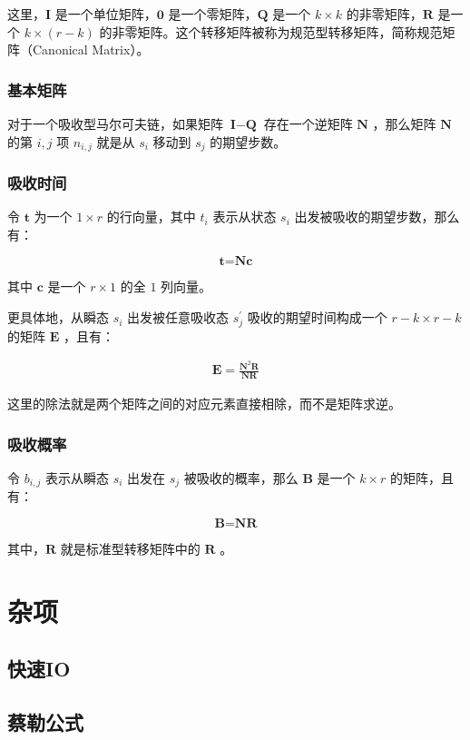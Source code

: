 \documentclass{article}
\begin{document}
这里，$\textbf{I}$ 是一个单位矩阵，$\textbf{0}$ 是一个零矩阵，$\textbf{Q}$ 是一个 $k\times k$ 的非零矩阵，$\textbf{R}$ 是一个 $k\times (r-k)$ 的非零矩阵。这个转移矩阵被称为规范型转移矩阵，简称规范矩阵（Canonical Matrix）。

\subsubsection{基本矩阵}
对于一个吸收型马尔可夫链，如果矩阵 $\textbf{I}-\textbf{Q}$ 存在一个逆矩阵 $\textbf{N}$ ，那么矩阵 $\textbf{N}$ 的第 $i,j$ 项 $n_{i,j}$ 就是从 $s_i$ 移动到 $s_j$ 的期望步数。

\subsubsection{吸收时间}
令 $\textbf{t}$ 为一个 $1\times r$ 的行向量，其中 $t_i$ 表示从状态 $s_i$ 出发被吸收的期望步数，那么有：

$$\textbf{t}=\textbf{Nc}$$

其中 $\textbf{c}$ 是一个 $r\times 1$ 的全 $1$ 列向量。

更具体地，从瞬态 $s_i$ 出发被任意吸收态 $s^{\prime}_{j}$ 吸收的期望时间构成一个 $r-k \times r-k$ 的矩阵 $\textbf{E}$ ，且有：

$$
\begin{aligned}
\textbf{E} = \frac{\textbf{N}^2\textbf{R}}{\textbf{NR}}
\end{aligned}
$$

这里的除法就是两个矩阵之间的对应元素直接相除，而不是矩阵求逆。

\subsubsection{吸收概率}
令 $b_{i,j}$ 表示从瞬态 $s_i$ 出发在 $s_j$ 被吸收的概率，那么 $\textbf{B}$ 是一个 $k\times r$ 的矩阵，且有：

$$\textbf{B}=\textbf{NR}$$

其中，$\textbf{R}$ 就是标准型转移矩阵中的 $\textbf{R}$ 。



\section{杂项}
\subsection{快速IO}

\subsection{蔡勒公式}

\end{document}

